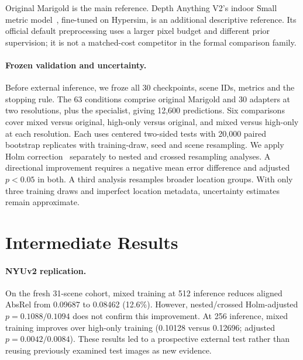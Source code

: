Original Marigold is the main reference. Depth Anything V2's indoor Small metric model~\cite{dav2}, fine-tuned on Hypersim, is an additional descriptive reference. Its official default preprocessing uses a larger pixel budget and different prior supervision; it is not a matched-cost competitor in the formal comparison family.

\paragraph{Frozen validation and uncertainty.}
Before external inference, we froze all 30 checkpoints, scene IDs, metrics and the stopping rule. The 63 conditions comprise original Marigold and 30 adapters at two resolutions, plus the specialist, giving 12,600 predictions. Six comparisons cover mixed versus original, high-only versus original, and mixed versus high-only at each resolution. Each uses centered two-sided tests with 20,000 paired bootstrap replicates with training-draw, seed and scene resampling. We apply Holm correction~\cite{holm} separately to nested and crossed resampling analyses. A directional improvement requires a negative mean error difference and adjusted $p<0.05$ in both. A third analysis resamples broader location groups. With only three training draws and imperfect location metadata, uncertainty estimates remain approximate.

\section{Intermediate Results}
\paragraph{NYUv2 replication.}
On the fresh 31-scene cohort, mixed training at 512 inference reduces aligned AbsRel from 0.09687 to 0.08462 (12.6\%). However, nested/crossed Holm-adjusted $p=0.1088/0.1094$ does not confirm this improvement. At 256 inference, mixed training improves over high-only training (0.10128 versus 0.12696; adjusted $p=0.0042/0.0084$). These results led to a prospective external test rather than reusing previously examined test images as new evidence.

